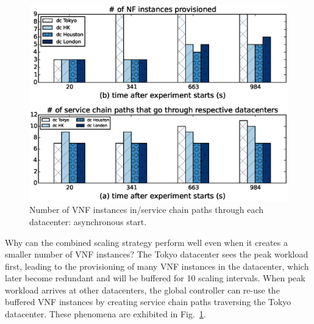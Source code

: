 \begin{figure}[!h]
        \centering
        \includegraphics[width=1\columnwidth]{chap-scalims/figure/nonsyn-reason.eps}
        \caption{%
		 Number of VNF instances in/service chain paths through each datacenter: asynchronous start.}
        \label{fig:nonsyn-scpath}
\end{figure}

Why can the combined scaling strategy perform well even when it creates a smaller number of VNF instances? The Tokyo datacenter sees the peak workload first, leading to the provisioning of many VNF instances in the datacenter, which later become redundant and will be buffered for 10 scaling intervals. When peak workload arrives at other datacenters, the global controller can re-use the buffered VNF instances by creating service chain paths traversing the Tokyo datacenter. %
 These phenomena are exhibited in Fig.~\ref{fig:nonsyn-scpath}. %



